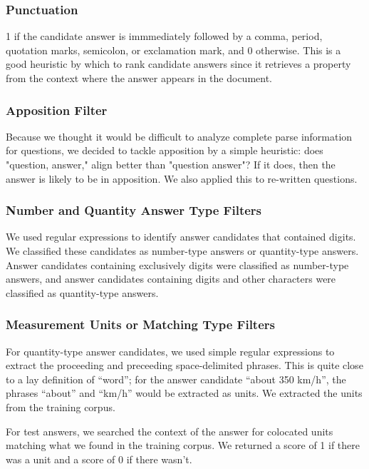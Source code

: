 \documentclass{article}
\begin{document}
\subsubsection{Punctuation}

	1 if the candidate answer is immmediately followed by a comma, period,
	quotation marks, semicolon, or exclamation mark, and 0 otherwise. This is a
	good heuristic by which to rank candidate answers since it retrieves a
	property from the context where the answer appears in the document.

\subsubsection{Apposition Filter}

	Because we thought it would be difficult to analyze complete parse
	information for questions, we decided to tackle apposition by a simple
	heuristic:  does "question, answer," align better than "question answer"?
	If it does, then the answer is likely to be in apposition.  We also applied
	this to re-written questions.


\subsubsection{Number and Quantity Answer Type Filters}
We used regular expressions to identify answer candidates that contained digits.
We classified these candidates as number-type answers or quantity-type answers.
Answer candidates containing exclusively digits were classified as number-type
answers, and answer candidates containing digits and other characters were classified
as quantity-type answers.

\subsubsection{Measurement Units or Matching Type Filters}
For quantity-type answer candidates, we used simple regular expressions to extract
the proceeding and preceeding space-delimited phrases. This is quite close to a
lay definition of ``word''; for the answer candidate ``about 350 km/h'', the
phrases ``about'' and ``km/h'' would be extracted as units. We extracted the units
from the training corpus.

For test answers, we searched the context of the answer for colocated units
matching what we found in the training corpus. We returned a score of 1 if there
was a unit and a score of 0 if there wasn't.
\end{document}
